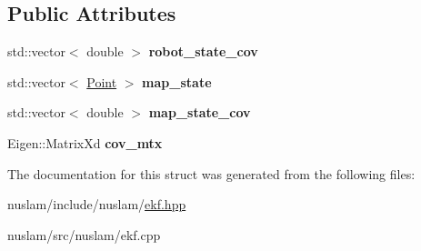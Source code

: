 \subsection*{Public Attributes}
\begin{DoxyCompactItemize}
\item 
\mbox{\label{structnuslam_1_1CovarianceMatrix_a8a667ab78f5bbefb92b354524a031e7e}} 
std\+::vector$<$ double $>$ {\bfseries robot\+\_\+state\+\_\+cov}
\item 
\mbox{\label{structnuslam_1_1CovarianceMatrix_ac966e05d92a7e27a7d1ff68114697c3f}} 
std\+::vector$<$ \hyperlink{structnuslam_1_1Point}{Point} $>$ {\bfseries map\+\_\+state}
\item 
\mbox{\label{structnuslam_1_1CovarianceMatrix_a615413478283a7d1ac557af2090405c7}} 
std\+::vector$<$ double $>$ {\bfseries map\+\_\+state\+\_\+cov}
\item 
\mbox{\label{structnuslam_1_1CovarianceMatrix_aca511a835b0c6e25e47a7dbb033d29ed}} 
Eigen\+::\+Matrix\+Xd {\bfseries cov\+\_\+mtx}
\end{DoxyCompactItemize}


The documentation for this struct was generated from the following files\+:\begin{DoxyCompactItemize}
\item 
nuslam/include/nuslam/\hyperlink{ekf_8hpp}{ekf.\+hpp}\item 
nuslam/src/nuslam/ekf.\+cpp\end{DoxyCompactItemize}
